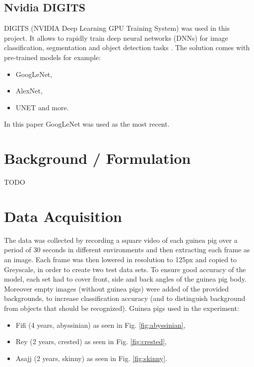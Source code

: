 \documentclass[10pt,journal,compsoc]{IEEEtran}
\begin{document}
    \subsection{Nvidia DIGITS}
    DIGITS (NVIDIA Deep Learning GPU Training System) was used in this project. It allows to rapidly train deep neural networks (DNNs) for image classification, segmentation and object detection tasks \cite{digitswww}. \newline\newline
    The solution comes with pre-trained models for example:

    \begin{itemize}
        \item GoogLeNet,
        \item AlexNet,
        \item UNET and more.        
    \end{itemize}
    \noindent
    In this paper GoogLeNet was used as the most recent.
    
    \section{Background / Formulation}
    TODO
    
    \section{Data Acquisition}
    The data was collected by recording a square video of each guinea pig over a period of 30 seconds in different environments and then extracting each frame as an image. Each frame was then lowered in resolution to 125px and copied to Greyscale, in order to create two test data sets.
    \newline\newline
    To ensure good accuracy of the model, each set had to cover front, side and back angles of the guinea pig body. Moreover empty images (without guinea pigs) were added of the provided backgrounds, to increase classification accuracy (and to distinguish background from objects that should be recognized).
    \newline\newline
    Guinea pigs used in the experiment:

    \begin{itemize}
        \item Fifi (4 years, abyssinian) as seen in Fig. \ref{fig:abyssinian},
        \item Rey (2 years, crested) as seen in Fig. \ref{fig:crested},
        \item Asajj (2 years, skinny) as seen in Fig. \ref{fig:skinny}.
    \end{itemize}
\end{document}
